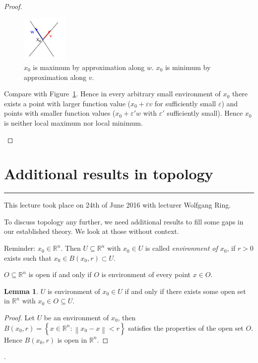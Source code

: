 \documentclass[a4paper,landscape,twocolumn]{article}
\theoremstyle{definition}
\newtheorem{lemma}{Lemma}
\newcommand\set[1]{\left\{#1\right\}}
\newcommand\meta[3]{\hrule{} This #1 took place on #2 with lecturer #3.\par}
\newcommand\norm[1]{\left\|#1\right\|}
\begin{document}
\begin{proof}
\begin{enumerate}
  \begin{figure}[!h]
    \begin{center}
      \includegraphics[width=0.2\textwidth]{img/min.pdf}
      \caption{
        $x_0$ is maximum by approximation along $w$.
        $x_0$ is minimum by approximation along $v$.
      }
      \label{img:min}
    \end{center}
  \end{figure}

  Compare with Figure~\ref{img:min}.
  Hence in every arbitrary small environment of $x_0$ there exists a point
  with larger function value ($x_0 + \varepsilon v$ for sufficiently small $\varepsilon$)
  and points with smaller function values ($x_0 + \varepsilon' w$ with $\varepsilon'$ sufficiently small).
  Hence $x_0$ is neither local maximum nor local minimum.
  \end{enumerate}
\end{proof}

\section{Additional results in topology}
\meta{lecture}{24th of June 2016}{Wolfgang Ring}
%
To discuss topology any further, we need additional results to fill some gaps
in our established theory. We look at those without context.

Reminder: $x_0 \in \mathbb R^n$. Then $U \subseteq \mathbb R^n$
with $x_0 \in U$ is called \emph{environment of $x_0$},
if $r>0$ exists such that $x_0 \in B(x_0,r) \subset U$.

$O \subseteq \mathbb R^n$ is open if and only if
$O$ is environment of every point $x \in O$.

\begin{lemma}
  $U$ is environment of $x_0 \in U$ if and only if
  there exists some open set in $\mathbb R^n$ with
  $x_0 \in O \subseteq U$.
\end{lemma}
\begin{proof}
  Let $U$ be an environment of $x_0$, then $B(x_0,r)
  = \set{x \in \mathbb R^n: \norm{x_0 - x} < r}$
  satisfies the properties of the open set $O$.
  Hence $B(x_0, r)$ is open in $\mathbb R^n$.
\end{proof}.
\end{document}
